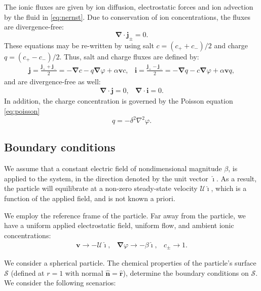 \documentclass[MSc,beforeExam]{iitcsthesis}
\newcommand\Laplacian{\nabla^2}
\newcommand\bnabla{\boldsymbol{\nabla}}
\newcommand\bv{\boldsymbol{v}}
\newcommand\bn{\boldsymbol{\hat{n}}}
\newcommand\bj{\boldsymbol{j}}
\newcommand\bi{\boldsymbol{i}}
\newcommand\br{\boldsymbol{r}}
\newcommand\brhat{\hat{\br}}
\newcommand\cU{\mathscr{U}}
\newcommand\ui{\boldsymbol{\hat{\imath}}}
\begin{document}
The ionic fluxes are given by ion diffusion, electrostatic forces and ion advection by the fluid
in \eqref{eq:nernst}. Due to conservation of ion concentrations, the fluxes are divergence-free:
\begin{equation*}
\bnabla \cdot \bj_\pm = 0.
\end{equation*}
These equations may be re-written by using salt $c = (c_+ + c_-)/2$ and charge $q = (c_+ - c_-)/2$.
Thus, salt and charge fluxes are defined by:
\begin{equation}\label{eq:fluxes}\begin{array}{cc}
  \bj = \frac{\bj_+ + \bj_-}{2} = -\bnabla c - q \bnabla \varphi + \alpha \bv c, & 
  \bi = \frac{\bj_+ - \bj_-}{2} = -\bnabla q - c \bnabla \varphi + \alpha \bv q,
\end{array}\end{equation}
and are divergence-free as well:
\begin{equation}\label{eq:zero_flux}\begin{array}{cc}
\bnabla \cdot \bj = 0, & 
\bnabla \cdot \bi = 0. 
\end{array}\end{equation}
In addition, the charge concentration is governed by the Poisson equation \eqref{eq:poisson}
\begin{equation}
q = -\delta^2 \Laplacian \varphi.
\end{equation}

\subsection{Boundary conditions}
We assume that a constant electric field of nondimensional magnitude $\beta$,
is applied to the system, in the direction denoted by the unit vector $\ui$.
As a result, the particle will equilibrate at 
a non-zero steady-state velocity $\cU \ui$, which is
a function of the applied field, and is not known a priori.

We employ the reference frame of the particle.
Far away from the particle, we have a uniform applied electrostatic field, uniform flow,
and ambient ionic concentrations:
\begin{equation}\label{eq:bndcond_inf}\begin{array}{ccc}
\bv \rightarrow -\cU \ui, &
\bnabla \varphi \rightarrow -\beta\ui, &
 c_\pm \rightarrow 1.
\end{array}\end{equation}

We consider a spherical particle.
The chemical properties of the particle's surface $\mathcal{S}$ (defined at $r=1$ 
with normal $\bn = \brhat$), determine the boundary conditions on $\mathcal{S}$.
We consider the following scenarios:
\end{document}
